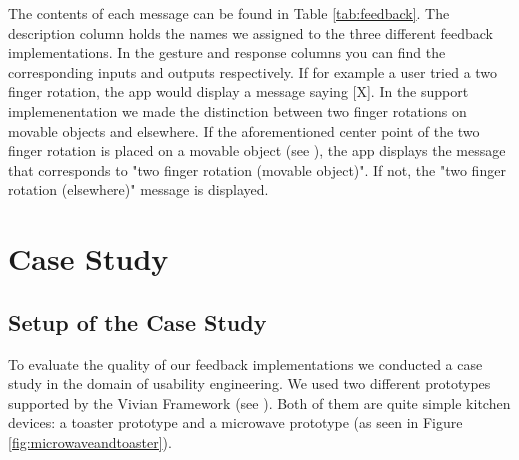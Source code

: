 \documentclass[11pt, a4paper]{article}
\begin{document}
		The contents of each message can be found in Table \ref{tab:feedback}. The description column holds the names we assigned to the three different feedback implementations. In the gesture and response columns you can find the corresponding inputs and outputs respectively. If for example a user tried a two finger rotation, the app would display a message saying [X].
		In the support implemenentation we made the distinction between two finger rotations on movable objects and elsewhere. If the aforementioned center point of the two finger rotation is placed on a movable object (see ), the app displays the message that corresponds to "two finger rotation (movable object)". If not, the "two finger rotation (elsewhere)" message is displayed.

	\section*{Case Study}\label{sec:casestudy}
		\subsection*{Setup of the Case Study}\label{ssec:setup}
			To evaluate the quality of our feedback implementations we conducted a case study in the domain of usability engineering. We used two different prototypes supported by the Vivian Framework (see ). Both of them are quite simple kitchen devices: a toaster prototype and a microwave prototype (as seen in Figure \ref{fig:microwaveandtoaster}).
\end{document}
